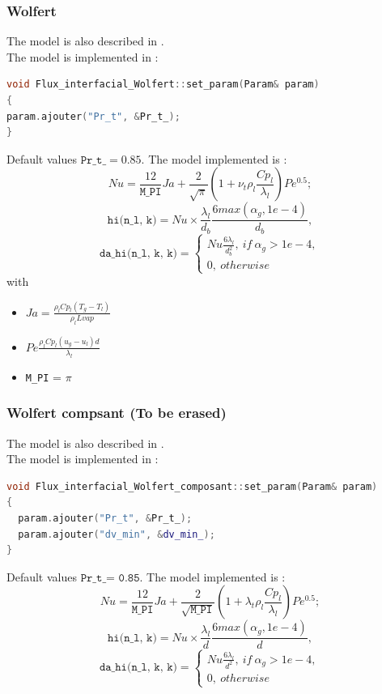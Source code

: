 \subsubsection{Wolfert}
The model is also described in \cite{}.\\
The model is implemented in :
\begin{lstlisting}[language=c++]
void Flux_interfacial_Wolfert::set_param(Param& param)
{
param.ajouter("Pr_t", &Pr_t_);
}
\end{lstlisting}
Default values $\texttt{Pr\_t\_} = 0.85$.
The model implemented is :
\begin{equation}
        Nu = \frac{12}{\texttt{M_{PI}}} Ja  +\frac{2}{\sqrt{\pi}}(1+\nu_t\rho_l \frac{Cp_l}{\lambda_l})Pe^{0.5};
\end{equation}
\begin{equation}
    \texttt{hi(n_l, k)} = Nu \times \frac{\lambda_l}{d_b} \frac{6max(\alpha_g,1e-4)}{d_b},
\end{equation}
\begin{equation}
\texttt{da\_hi(n_l, k, k)} = \begin{cases}
    Nu \frac{6\lambda_l}{d_b^2},\ if\ \alpha_g> 1e-4,\\ 0,\ otherwise
\end{cases}
\end{equation}
with
\begin{itemize}
    \item[\small \textcolor{blue}{\ding{109}}]$Ja=\frac{\rho_l Cp_l (T_g-T_l)}{\rho_lLvap}$
    \item[\small \textcolor{blue}{\ding{109}}]$Pe\frac{\rho_l Cp_l (u_g-u_l)d}{\lambda_l}$
    \item[\small \textcolor{blue}{\ding{109}}]\texttt{M\_PI} = $\pi$
\end{itemize}

\subsubsection{Wolfert compsant (To be erased)}
The model is also described in \cite{}.\\
The model is implemented in :
\begin{lstlisting}[language=c++]
void Flux_interfacial_Wolfert_composant::set_param(Param& param)
{
  param.ajouter("Pr_t", &Pr_t_);
  param.ajouter("dv_min", &dv_min_);
}
\end{lstlisting}
Default values $\texttt{Pr\_t\_ = 0.85}$.
The model implemented is :
\begin{equation}
Nu = \frac{12}{\texttt{M_{PI}}} Ja  +\frac{2}{\sqrt{\texttt{M_{PI}}}}(1+\lambda_t\rho_l \frac{Cp_l}{\lambda_l})Pe^{0.5};
\end{equation}
\begin{equation}
    \texttt{hi(n_l, k)} = Nu \times\frac{\lambda_l}{d} \frac{6max(\alpha_g,1e-4)}{d},
\end{equation}
\begin{equation}
\texttt{da\_hi(n_l, k, k)} = \begin{cases}
    Nu \frac{6\lambda_l}{d^2},\ if\ \alpha_g> 1e-4,\\ 0,\ otherwise
\end{cases}
\end{equation}

